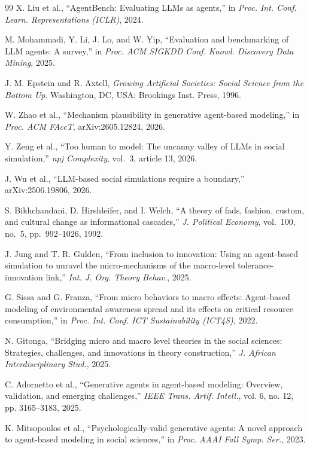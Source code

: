 \documentclass[11pt]{article}
\begin{document}
\begin{thebibliography}{99}
X. Liu et al., ``AgentBench: Evaluating LLMs as agents,'' in \emph{Proc. Int. Conf. Learn. Representations (ICLR)}, 2024.

M. Mohammadi, Y. Li, J. Lo, and W. Yip, ``Evaluation and benchmarking of LLM agents: A survey,'' in \emph{Proc. ACM SIGKDD Conf. Knowl. Discovery Data Mining}, 2025.

J. M. Epstein and R. Axtell, \emph{Growing Artificial Societies: Social Science from the Bottom Up}. Washington, DC, USA: Brookings Inst. Press, 1996.

W. Zhao et al., ``Mechanism plausibility in generative agent-based modeling,'' in \emph{Proc. ACM FAccT}, arXiv:2605.12824, 2026.

Y. Zeng et al., ``Too human to model: The uncanny valley of LLMs in social simulation,'' \emph{npj Complexity}, vol.\ 3, article 13, 2026.

J. Wu et al., ``LLM-based social simulations require a boundary,'' arXiv:2506.19806, 2026.

S. Bikhchandani, D. Hirshleifer, and I. Welch, ``A theory of fads, fashion, custom, and cultural change as informational cascades,'' \emph{J. Political Economy}, vol.\ 100, no.\ 5, pp.\ 992--1026, 1992.

J. Jung and T. R. Gulden, ``From inclusion to innovation: Using an agent-based simulation to unravel the micro-mechanisms of the macro-level tolerance-innovation link,'' \emph{Int. J. Org. Theory Behav.}, 2025.

G. Sissa and G. Franza, ``From micro behaviors to macro effects: Agent-based modeling of environmental awareness spread and its effects on critical resource consumption,'' in \emph{Proc. Int. Conf. ICT Sustainability (ICT4S)}, 2022.

N. Gitonga, ``Bridging micro and macro level theories in the social sciences: Strategies, challenges, and innovations in theory construction,'' \emph{J. African Interdisciplinary Stud.}, 2025.

C. Adornetto et al., ``Generative agents in agent-based modeling: Overview, validation, and emerging challenges,'' \emph{IEEE Trans. Artif. Intell.}, vol. 6, no. 12, pp. 3165--3183, 2025.

K. Mitsopoulos et al., ``Psychologically-valid generative agents: A novel approach to agent-based modeling in social sciences,'' in \emph{Proc. AAAI Fall Symp. Ser.}, 2023.


\end{thebibliography}
\end{document}
